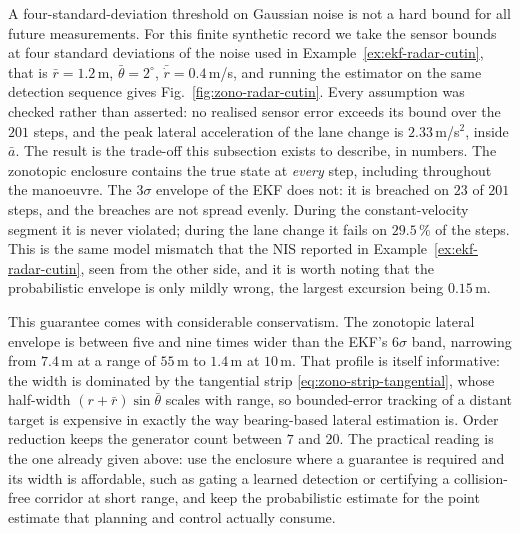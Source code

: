 \begin{example}
A four-standard-deviation threshold on Gaussian noise is not a hard bound for all future measurements. For this finite synthetic record we take the sensor bounds at four standard deviations of the noise used in
Example~\ref{ex:ekf-radar-cutin}, that is $\bar r=1.2$\,m,
$\bar\theta=2^{\circ}$, $\bar{\dot r}=0.4$\,m/s, and running the estimator on
the same detection sequence gives Fig.~\ref{fig:zono-radar-cutin}. Every
assumption was checked rather than asserted: no realised sensor error exceeds
its bound over the $201$ steps, and the peak lateral acceleration of the lane
change is $2.33$\,m/s$^{2}$, inside $\bar a$. The result is the trade-off this
subsection exists to describe, in numbers. The zonotopic enclosure contains the
true state at \emph{every} step, including throughout the manoeuvre. The
$3\sigma$ envelope of the EKF does not: it is breached on $23$ of $201$ steps,
and the breaches are not spread evenly. During the constant-velocity segment it
is never violated; during the lane change it fails on $29.5\,\%$ of the steps.
This is the same model mismatch that the NIS reported in
Example~\ref{ex:ekf-radar-cutin}, seen from the other side, and it is worth
noting that the probabilistic envelope is only mildly wrong, the largest
excursion being $0.15$\,m.

This guarantee comes with considerable conservatism. The zonotopic lateral envelope
is between five and nine times wider than the EKF's $6\sigma$ band, narrowing
from $7.4$\,m at a range of $55$\,m to $1.4$\,m at $10$\,m. That profile is
itself informative: the width is dominated by the tangential strip
\eqref{eq:zono-strip-tangential}, whose half-width $(r+\bar r)\sin\bar\theta$
scales with range, so bounded-error tracking of a distant target is expensive
in exactly the way bearing-based lateral estimation is. Order reduction keeps
the generator count between $7$ and $20$. The practical reading is the one
already given above: use the enclosure where a guarantee is required and its
width is affordable, such as gating a learned detection or certifying a
collision-free corridor at short range, and keep the probabilistic estimate for
the point estimate that planning and control actually consume.
\end{example}

